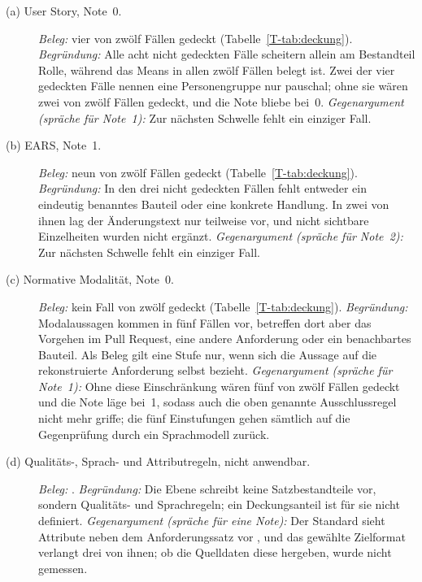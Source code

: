 \documentclass[11pt,a4paper]{report}
\begin{document}
\begin{description}
  \item[(a) User Story, Note~0.]
  \emph{Beleg:} vier von zwölf Fällen gedeckt
  (Tabelle~\ref{T-tab:deckung}).
  \emph{Begründung:} Alle acht nicht gedeckten Fälle scheitern allein am
  Bestandteil Rolle, während das Means in allen zwölf Fällen belegt ist.
  Zwei der vier gedeckten Fälle nennen eine Personengruppe nur pauschal;
  ohne sie wären zwei von zwölf Fällen gedeckt, und die Note bliebe
  bei~0.
  \emph{Gegenargument (spräche für Note~1):} Zur nächsten Schwelle fehlt
  ein einziger Fall.

  \item[(b) EARS, Note~1.]
  \emph{Beleg:} neun von zwölf Fällen gedeckt
  (Tabelle~\ref{T-tab:deckung}).
  \emph{Begründung:} In den drei nicht gedeckten Fällen fehlt entweder
  ein eindeutig benanntes Bauteil oder eine konkrete Handlung. In zwei
  von ihnen lag der Änderungstext nur teilweise vor, und nicht sichtbare
  Einzelheiten wurden nicht ergänzt.
  \emph{Gegenargument (spräche für Note~2):} Zur nächsten Schwelle fehlt
  ein einziger Fall.

  \item[(c) Normative Modalität, Note~0.]
  \emph{Beleg:} kein Fall von zwölf gedeckt
  (Tabelle~\ref{T-tab:deckung}).
  \emph{Begründung:} Modalaussagen kommen in fünf Fällen vor, betreffen
  dort aber das Vorgehen im Pull Request, eine andere Anforderung oder
  ein benachbartes Bauteil. Als Beleg gilt eine Stufe nur, wenn sich die
  Aussage auf die rekonstruierte Anforderung selbst bezieht.
  \emph{Gegenargument (spräche für Note~1):} Ohne diese Einschränkung
  wären fünf von zwölf Fällen gedeckt und die Note läge bei~1, sodass
  auch die oben genannte Ausschlussregel nicht mehr griffe; die fünf
  Einstufungen gehen sämtlich auf die Gegenprüfung durch ein
  Sprachmodell zurück.

  \item[(d) Qualitäts-, Sprach- und Attributregeln, nicht anwendbar.]
  \emph{Beleg:} \cite[Abschn.~5.2.5--5.2.7]{iso29148}.
  \emph{Begründung:} Die Ebene schreibt keine Satzbestandteile vor,
  sondern Qualitäts- und Sprachregeln; ein Deckungsanteil ist für sie
  nicht definiert.
  \emph{Gegenargument (spräche für eine Note):} Der Standard sieht
  Attribute neben dem Anforderungssatz vor
  \cite[Abschn.~5.2.8.1]{iso29148}, und das gewählte Zielformat verlangt
  drei von ihnen; ob die Quelldaten diese hergeben, wurde nicht
  gemessen.
\end{description}
\end{document}
